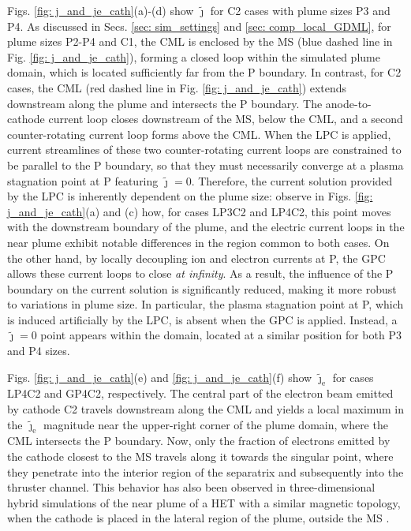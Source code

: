 \documentclass[%
 aip,
cha,
 amsmath,amssymb,
 reprint,%
]{revtex4-1}
\begin{document}
Figs. \ref{fig: j_and_je_cath}(a)-(d) show $\tilde{\bm\jmath}$ for C2 cases with plume sizes P3 and P4. 
%
As discussed in Secs. \ref{sec: sim_settings} and \ref{sec: comp_local_GDML}, for plume sizes P2-P4 and C1, the CML is enclosed by the MS (blue dashed line in Fig. \ref{fig: j_and_je_cath}), forming a closed loop within the simulated plume domain, which is located sufficiently far from the P boundary.
%
In contrast, for C2 cases, the CML (red dashed line in Fig. \ref{fig: j_and_je_cath}) extends downstream along the plume and intersects the P boundary. The anode-to-cathode current loop closes downstream of the MS, below the CML, and a second counter-rotating current loop forms above the CML.
%
When the LPC is applied, current streamlines of these two counter-rotating current loops are constrained to be parallel to the P boundary, so that they must necessarily converge at a plasma stagnation point at P featuring $\tilde{\boldsymbol{\jmath}}=0$. Therefore, the current solution provided by the LPC is inherently dependent on the plume size: observe in Figs. \ref{fig: j_and_je_cath}(a) and (c) how, for cases LP3C2 and LP4C2, this point moves with the downstream boundary of the plume, and the electric current loops in the near plume exhibit notable differences in the region common to both cases.
%
On the other hand, by locally decoupling ion and electron currents at P, the GPC allows these current loops to close \textit{at infinity}. As a result, the influence of the P boundary on the current solution is significantly reduced, making it more robust to variations in plume size.
In particular, the plasma stagnation point at P, which is induced artificially by the LPC, is absent when the GPC is applied. Instead, a $\tilde{\boldsymbol{\jmath}}=0$ point appears within the domain, located at a similar position for both P3 and P4 sizes.

Figs. \ref{fig: j_and_je_cath}(e) and \ref{fig: j_and_je_cath}(f) show $\tilde{\bm\jmath}_\mathrm{e}$ for cases LP4C2 and GP4C2, respectively. 
%
The central part of the electron beam emitted by cathode C2 travels downstream along the CML and yields a local maximum in the $\tilde{\bm\jmath}_\mathrm{e}$ magnitude near the upper-right corner of the plume domain, where the CML intersects the P boundary.
%
Now, only the fraction of electrons emitted by the cathode closest to the MS travels along it towards the singular point, where they penetrate into the interior region of the separatrix and subsequently into the thruster channel.
%
This behavior has also been observed in three-dimensional hybrid simulations of the near plume of a HET with a similar magnetic topology, when the cathode is placed in the lateral region of the plume, outside the MS \cite{cich21a}.
\end{document}
